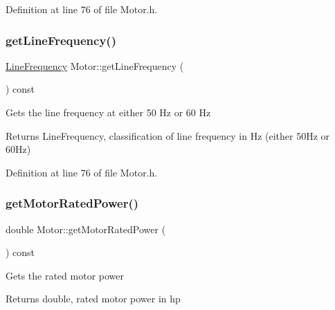 Definition at line 76 of file Motor.\+h.

\mbox{\label{class_motor_a41e71462fe60674a5554e47d0079b0f3}} 
\subsubsection{\texorpdfstring{get\+Line\+Frequency()}{getLineFrequency()}\hspace{0.1cm}{\footnotesize\ttfamily [3/3]}}
{\footnotesize\ttfamily \hyperlink{class_motor_acee1bdf1b684ad36cb80dc2829d9fcee}{Line\+Frequency} Motor\+::get\+Line\+Frequency (\begin{DoxyParamCaption}{ }\end{DoxyParamCaption}) const\hspace{0.3cm}{\ttfamily [inline]}}

Gets the line frequency at either 50 Hz or 60 Hz

\begin{DoxyReturn}{Returns}
Line\+Frequency, classification of line frequency in Hz (either 50\+Hz or 60\+Hz) 
\end{DoxyReturn}


Definition at line 76 of file Motor.\+h.

\mbox{\label{class_motor_a476d3790492959945b3b75d1638f737f}} 
\subsubsection{\texorpdfstring{get\+Motor\+Rated\+Power()}{getMotorRatedPower()}\hspace{0.1cm}{\footnotesize\ttfamily [1/3]}}
{\footnotesize\ttfamily double Motor\+::get\+Motor\+Rated\+Power (\begin{DoxyParamCaption}{ }\end{DoxyParamCaption}) const\hspace{0.3cm}{\ttfamily [inline]}}

Gets the rated motor power

\begin{DoxyReturn}{Returns}
double, rated motor power in hp 
\end{DoxyReturn}


